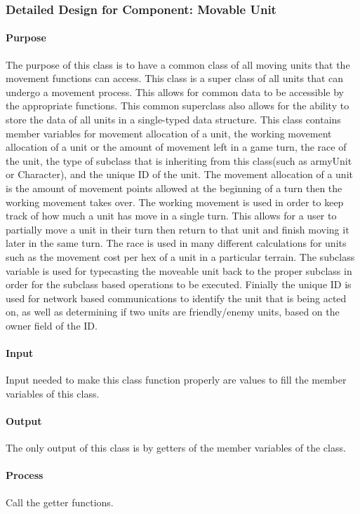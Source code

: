 \documentclass[12pt,a4paper,titlepage]{article}
\begin{document}
\subsubsection{Detailed Design for Component: Movable Unit}
\paragraph{Purpose} The purpose of this class is to have a common class of all moving units that the movement functions can access. This class is a super class of all units that can undergo a movement process. This allows for common data to be accessible by the appropriate functions. This common superclass also allows for the ability to store the data of all units in a single-typed data structure. This class contains member variables for movement allocation of a unit, the working movement allocation of a unit or the amount of movement left in a game turn, the race of the unit, the type of subclass that is inheriting from this class(such as armyUnit or Character), and the unique ID of the unit. The movement allocation of a unit is the amount of movement points allowed at the beginning of a turn then the working movement takes over. The working movement is used in order to keep track of how much a unit has move in a single turn. This allows for a user to partially move a unit in their turn then return to that unit and finish moving it later in the same turn. The race is used in many different calculations for units such as the movement cost per hex of a unit in a particular terrain. The subclass variable is used for typecasting the moveable unit back to the proper subclass in order for the subclass based operations to be executed. Finially the unique ID is used for network based communications to identify the unit that is being acted on, as well as determining if two units are friendly/enemy units, based on the owner field of the ID. 
\paragraph{Input} Input needed to make this class function properly are values to fill the member variables of this class. 
\paragraph{Output} The only output of this class is by getters of the member variables of the class. 
\paragraph{Process} Call the getter functions.
\end{document}
